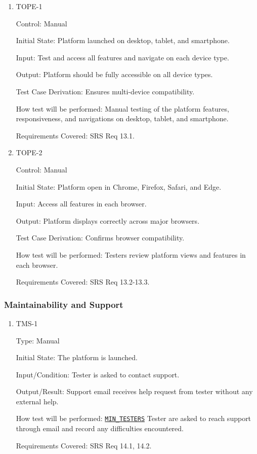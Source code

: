 \documentclass[12pt, titlepage]{article}
\begin{document}
\begin{enumerate}

\item{TOPE-1\\}

Control: Manual

Initial State: Platform launched on desktop, tablet, and smartphone.

Input: Test and access all features and navigate on each device type.

Output: Platform should be fully accessible on all device types.

Test Case Derivation: Ensures multi-device compatibility.

How test will be performed: Manual testing of the platform features, responsiveness, and navigations on desktop, tablet, and smartphone.

Requirements Covered: SRS Req 13.1.

\item{TOPE-2\\}

Control: Manual

Initial State: Platform open in Chrome, Firefox, Safari, and Edge.

Input: Access all features in each browser.

Output: Platform displays correctly across major browsers.

Test Case Derivation: Confirms browser compatibility.

How test will be performed: Testers review platform views and features in each browser.

Requirements Covered: SRS Req 13.2-13.3.

\end{enumerate}

\subsubsection{Maintainability and Support}

\begin{enumerate}

\item{TMS-1\\}

Type: Manual

Initial State: The platform is launched.

Input/Condition: Tester is asked to contact support.

Output/Result: Support email receives help request from tester without any external help.

How test will be performed: \hyperref[MIN_TESTERS]{\texttt{MIN\_TESTERS}} Tester are asked to reach
support through email and record any difficulties encountered.

Requirements Covered: SRS Req 14.1, 14.2.

\end{enumerate}
\end{document}
